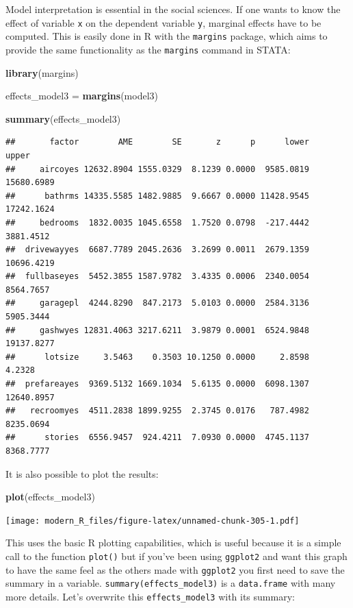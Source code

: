 \documentclass[]{gitbook}
\newenvironment{Shaded}{\begin{snugshade}}{\end{snugshade}}
\newcommand{\KeywordTok}[1]{\textcolor[rgb]{0.13,0.29,0.53}{\textbf{#1}}}
\newcommand{\NormalTok}[1]{#1}
\newcommand{\StringTok}[1]{\textcolor[rgb]{0.31,0.60,0.02}{#1}}
\theoremstyle{definition}
\theoremstyle{definition}
\theoremstyle{definition}
\theoremstyle{remark}
\begin{document}
Model interpretation is essential in the social sciences. If one wants
to know the effect of variable \texttt{x} on the dependent variable
\texttt{y}, marginal effects have to be computed. This is easily done in
R with the \texttt{margins} package, which aims to provide the same
functionality as the \texttt{margins} command in STATA:

\begin{Shaded}
\begin{Highlighting}[]
\KeywordTok{library}\NormalTok{(margins)}

\NormalTok{effects_model3 =}\StringTok{ }\KeywordTok{margins}\NormalTok{(model3)}

\KeywordTok{summary}\NormalTok{(effects_model3)}
\end{Highlighting}
\end{Shaded}

\begin{verbatim}
##       factor        AME        SE       z      p      lower      upper
##     aircoyes 12632.8904 1555.0329  8.1239 0.0000  9585.0819 15680.6989
##      bathrms 14335.5585 1482.9885  9.6667 0.0000 11428.9545 17242.1624
##     bedrooms  1832.0035 1045.6558  1.7520 0.0798  -217.4442  3881.4512
##  drivewayyes  6687.7789 2045.2636  3.2699 0.0011  2679.1359 10696.4219
##  fullbaseyes  5452.3855 1587.9782  3.4335 0.0006  2340.0054  8564.7657
##     garagepl  4244.8290  847.2173  5.0103 0.0000  2584.3136  5905.3444
##     gashwyes 12831.4063 3217.6211  3.9879 0.0001  6524.9848 19137.8277
##      lotsize     3.5463    0.3503 10.1250 0.0000     2.8598     4.2328
##  prefareayes  9369.5132 1669.1034  5.6135 0.0000  6098.1307 12640.8957
##   recroomyes  4511.2838 1899.9255  2.3745 0.0176   787.4982  8235.0694
##      stories  6556.9457  924.4211  7.0930 0.0000  4745.1137  8368.7777
\end{verbatim}

It is also possible to plot the results:

\begin{Shaded}
\begin{Highlighting}[]
\KeywordTok{plot}\NormalTok{(effects_model3)}
\end{Highlighting}
\end{Shaded}

\texttt{[image: modern\_R\_files/figure-latex/unnamed-chunk-305-1.pdf]}

This uses the basic R plotting capabilities, which is useful because it
is a simple call to the function \texttt{plot()} but if you've been
using \texttt{ggplot2} and want this graph to have the same feel as the
others made with \texttt{ggplot2} you first need to save the summary in
a variable. \texttt{summary(effects\_model3)} is a \texttt{data.frame}
with many more details. Let's overwrite this \texttt{effects\_model3}
with its summary:
\end{document}

